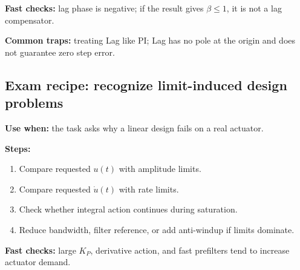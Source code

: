 \textbf{Fast checks:} lag phase is negative; if the result gives \(\beta\leq1\), it is not a lag compensator.

\textbf{Common traps:} treating Lag like PI; Lag has no pole at the origin and does not guarantee zero step error.

\subsection{Exam recipe: recognize limit-induced design problems}

\textbf{Use when:} the task asks why a linear design fails on a real actuator.

\textbf{Steps:}
\begin{enumerate}
\item Compare requested \(u(t)\) with amplitude limits.
\item Compare requested \(\dot{u}(t)\) with rate limits.
\item Check whether integral action continues during saturation.
\item Reduce bandwidth, filter reference, or add anti-windup if limits dominate.
\end{enumerate}

\textbf{Fast checks:} large \(K_P\), derivative action, and fast prefilters tend to increase actuator demand.
